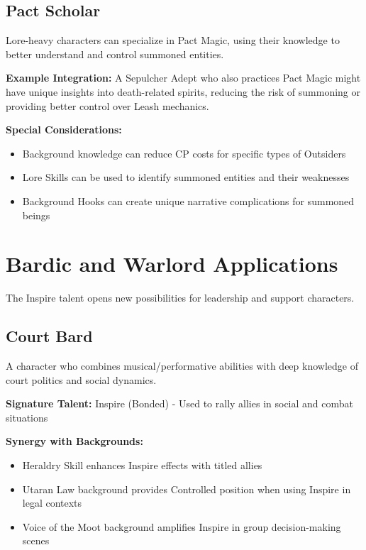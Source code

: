\subsection{Pact Scholar}
Lore-heavy characters can specialize in Pact Magic, using their knowledge to better understand and control summoned entities.

\textbf{Example Integration:} A Sepulcher Adept who also practices Pact Magic might have unique insights into death-related spirits, reducing the risk of summoning or providing better control over Leash mechanics.

\textbf{Special Considerations:}
\begin{itemize}
    \item Background knowledge can reduce CP costs for specific types of Outsiders
    \item Lore Skills can be used to identify summoned entities and their weaknesses
    \item Background Hooks can create unique narrative complications for summoned beings
\end{itemize}

\section{Bardic and Warlord Applications}

The Inspire talent opens new possibilities for leadership and support characters.

\subsection{Court Bard}
A character who combines musical/performative abilities with deep knowledge of court politics and social dynamics.

\textbf{Signature Talent:} Inspire (Bonded) - Used to rally allies in social and combat situations

\textbf{Synergy with Backgrounds:}
\begin{itemize}
    \item Heraldry Skill enhances Inspire effects with titled allies
    \item Utaran Law background provides Controlled position when using Inspire in legal contexts
    \item Voice of the Moot background amplifies Inspire in group decision-making scenes
\end{itemize}

